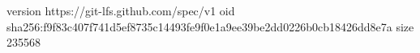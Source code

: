 version https://git-lfs.github.com/spec/v1
oid sha256:f9f83c407f741d5ef8735c14493fe9f0e1a9ee39be2dd0226b0cb18426dd8e7a
size 235568
